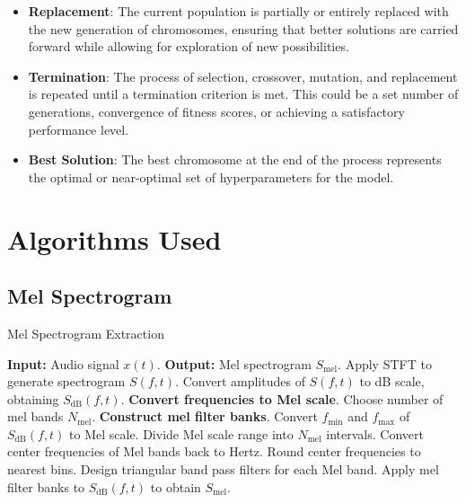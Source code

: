 \begin{itemize}
      \item \textbf{Replacement}:
             The current population is partially or entirely replaced with the new
                        generation of chromosomes, ensuring that better solutions are carried forward
                        while allowing for exploration of new possibilities.
            

      \item \textbf{Termination}:
            The process of selection, crossover, mutation, and replacement is repeated
                        until a termination criterion is met. This could be a set number of generations, convergence of fitness scores, or
                        achieving a satisfactory performance level.
            

      \item \textbf{Best Solution}:
            The best chromosome at the end of the process represents the optimal or near-optimal set of hyperparameters for the model.
\end{itemize}
\newpage
\section{Algorithms Used}
\subsection{Mel Spectrogram}
\begin{algorithm}[H]
    \caption{Mel Spectrogram Extraction}
    \begin{algorithmic}[1]

        \STATE \textbf{Input:} Audio signal $x(t)$.
        \STATE \textbf{Output:} Mel spectrogram $S_{\text{mel}}$.
        \STATE Apply STFT to generate spectrogram $S(f, t)$.
        \STATE Convert amplitudes of $S(f, t)$ to dB scale, obtaining
        $S_{\text{dB}}(f, t)$.
        \STATE \textbf{Convert frequencies to Mel scale}.
        \STATE \hspace{10} Choose number of mel bands $N_{\text{mel}}$.
        \STATE \textbf{Construct mel filter banks}.
        \STATE \hspace{10} Convert $f_{\text{min}}$ and $f_{\text{max}}$ of
        $S_{\text{dB}}(f, t)$ to Mel scale.
        \STATE \hspace{10} Divide Mel scale range into $N_{\text{mel}}$
        intervals.
        \STATE \hspace{10} Convert center frequencies of Mel bands back to
        Hertz.
        \STATE \hspace{10} Round center frequencies to nearest bins.
        \STATE \hspace{10} Design triangular band pass filters for each Mel
        band.
        \STATE \hspace{10} Apply mel filter banks to $S_{\text{dB}}(f, t)$ to
        obtain $S_{\text{mel}}$.
    \end{algorithmic}
\end{algorithm}

